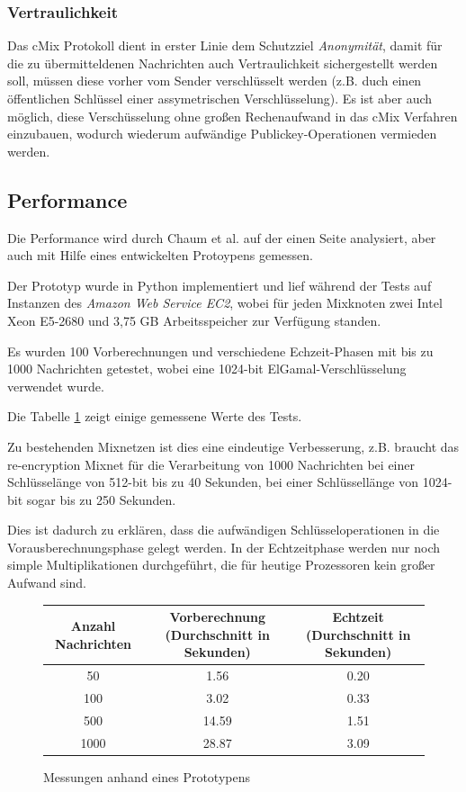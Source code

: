 \documentclass[
    fontsize=12pt,
    headings=small,
    parskip=half,           %
    bibliography=totoc,
    numbers=noenddot,       %
    open=any,               %
    ]{scrreprt}
\begin{document}
\subsubsection{Vertraulichkeit}

Das cMix Protokoll dient in erster Linie dem Schutzziel \textit{Anonymität},
damit für die zu übermitteldenen Nachrichten auch Vertraulichkeit sichergestellt werden soll, müssen diese vorher vom Sender verschlüsselt werden (z.B. duch einen öffentlichen Schlüssel einer assymetrischen Verschlüsselung).
Es ist aber auch möglich, diese Verschüsselung ohne großen Rechenaufwand in das cMix Verfahren einzubauen, wodurch wiederum aufwändige Publickey-Operationen vermieden werden.

\subsection{Performance}

Die Performance wird durch Chaum et al. auf der einen Seite analysiert, aber auch mit Hilfe eines entwickelten Protoypens gemessen.

Der Prototyp wurde in Python implementiert und lief während der Tests auf Instanzen des \textit{Amazon Web Service EC2}, wobei für jeden Mixknoten zwei Intel Xeon E5-2680 und 3,75 GB Arbeitsspeicher zur Verfügung standen.

Es wurden 100 Vorberechnungen und verschiedene Echzeit-Phasen mit bis zu 1000 Nachrichten getestet, wobei eine 1024-bit ElGamal-Verschlüsselung verwendet wurde.

Die Tabelle \ref{fig:messung} zeigt einige gemessene Werte des Tests.

Zu bestehenden Mixnetzen ist dies eine eindeutige Verbesserung,
z.B. braucht das re-encryption Mixnet für die Verarbeitung von 1000 Nachrichten bei einer Schlüsselänge von 512-bit bis zu 40 Sekunden, bei einer Schlüssellänge von 1024-bit sogar bis zu 250 Sekunden.\cite{ribarski2012mixnets}

Dies ist dadurch zu erklären, dass die aufwändigen Schlüsseloperationen in die Vorausberechnungsphase gelegt werden. In der Echtzeitphase werden nur noch simple Multiplikationen durchgeführt, die für heutige Prozessoren kein großer Aufwand sind.




\begin{figure}

\begin{tabular}{c|c|c}

Anzahl Nachrichten & Vorberechnung (Durchschnitt in Sekunden) & Echtzeit (Durchschnitt in Sekunden) \\ 
\hline 
50 & 1.56 & 0.20 \\ 
\hline 
100 & 3.02 & 0.33 \\ 
\hline 
500 & 14.59 & 1.51 \\ 
\hline 
1000 & 28.87 & 3.09 \\ 

\end{tabular} 
\caption{Messungen anhand eines Prototypens} \label{fig:messung} 
\end{figure}
\end{document}
